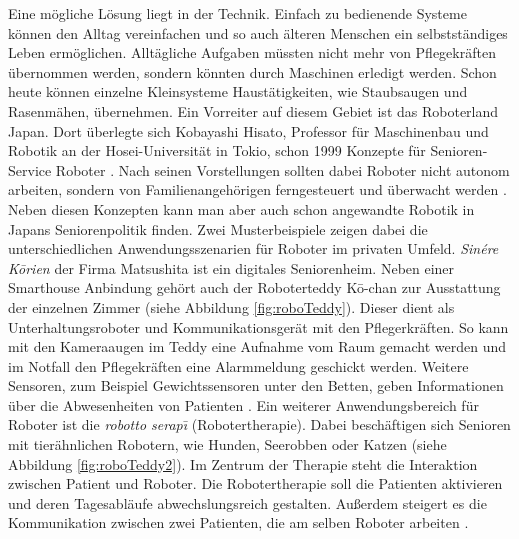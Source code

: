 Eine mögliche Lösung liegt in der Technik. Einfach zu bedienende Systeme können den Alltag vereinfachen und so auch älteren Menschen ein selbstständiges Leben ermöglichen. Alltägliche Aufgaben müssten nicht mehr von Pflegekräften übernommen werden, sondern könnten durch Maschinen erledigt werden. Schon heute können einzelne Kleinsysteme Haustätigkeiten, wie Staubsaugen und Rasenmähen, übernehmen. Ein Vorreiter auf diesem Gebiet ist das Roboterland Japan. Dort überlegte sich Kobayashi Hisato, Professor für Maschinenbau und Robotik an der Hosei-Universität in Tokio, schon 1999 Konzepte für Senioren-Service Roboter \citep{wagner2009tele}. Nach seinen Vorstellungen sollten dabei Roboter nicht autonom arbeiten, sondern von Familienangehörigen ferngesteuert und überwacht werden \citep{kobayashihisato1999}. Neben diesen Konzepten kann man aber auch schon angewandte Robotik in Japans Seniorenpolitik finden. Zwei Musterbeispiele zeigen dabei die unterschiedlichen Anwendungsszenarien für Roboter im privaten Umfeld. \textit{Sinére K\={o}rien} der Firma Matsushita ist ein digitales Seniorenheim. Neben einer Smarthouse Anbindung gehört auch der Roboterteddy K\={o}-chan zur Ausstattung der einzelnen Zimmer (siehe Abbildung \ref{fig:roboTeddy}). Dieser dient als Unterhaltungsroboter und Kommunikationsgerät mit den Pflegerkräften. So kann mit den Kameraaugen im Teddy eine Aufnahme vom Raum gemacht werden und im Notfall den Pflegekräften eine Alarmmeldung geschickt werden. Weitere Sensoren, zum  Beispiel Gewichtssensoren unter den Betten, geben Informationen über die Abwesenheiten von Patienten \citep{wagner2009tele}. Ein weiterer Anwendungsbereich für Roboter ist die \textit{robotto serap\={\i}} (Robotertherapie). Dabei beschäftigen sich Senioren mit tierähnlichen Robotern, wie Hunden, Seerobben oder Katzen (siehe Abbildung \ref{fig:roboTeddy2}). Im Zentrum der Therapie steht die Interaktion zwischen Patient und Roboter. Die Robotertherapie soll die Patienten aktivieren und deren Tagesabläufe abwechslungsreich gestalten. Außerdem steigert es die Kommunikation zwischen zwei Patienten, die am selben Roboter arbeiten \citep{wagner2009tele}. 

